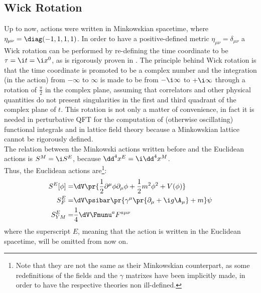 \begin{comment}
\\Everything that has been said for $\SUN$ can be also extended to $\mathit{SO}(N)$ by replacing \emph{unitary} with \emph{orthogonal} and \emph{traceless} with \emph{antisymmetric}. In fact, this discussion can be made for every compact\footnote{Compactness, \ie $\Tr{T^aT^b}$ positive defined, is required in order to have a bounded from below Hamiltonian.} group, such as the symplectic group $\mathit{Sp}(2N)$ and the five exceptional Lie groups $\mathit{G}(2)$, $\spF$, $\mathit{E}(6)$, $\mathit{E}(7)$ and $\mathit{E}(8)$.
\end{comment}

\subsection{Wick Rotation}
Up to now, actions were written in Minkowskian spacetime, where $\eta_{\mu\nu} = \diag(-1,1,1,1)$. In order to have a positive-defined metric $\eta_{\mu\nu} = \delta_{\mu\nu}$ a Wick rotation can be performed by re-defining the time coordinate to be $\tau = \i t = \i x^0$, as is rigorously proven in \cite{SCHLINGEMANN_1999}.
The principle behind Wick rotation is that the time coordinate is promoted to be a complex number and the integration (in the action) from $-\infty$ to $\infty$ is made to be from $-\i\infty$ to $+\i\infty$ through a rotation of $\frac\pi2$ in the complex plane, assuming that correlators and other physical quantities do not present singularities in the first and third quadrant of the complex plane of $t$.
This rotation is not only a matter of convenience, in fact it is needed in perturbative QFT for the computation of (otherwise oscillating) functional integrals and in lattice field theory because a Minkowskian lattice cannot be rigorously defined.\\
The relation between the Minkowski actions written before and the Euclidean actions is $S^M = \i S^E$, because $\dd^4x^E = \i \dd^4x^M$.\\
Thus, the Euclidean actions are\footnote{Note that they are not the same as their Minkowskian counterpart, as some redefinitions of the fields and the $\gamma$ matrixes have been implicitly made, in order to have the respective theories non ill-defined.}:
\begin{align}
    S^E[\phi] =& \dV \pr{\frac12\partial^\mu\phi\partial_\mu\phi+\frac12m^2\phi^2+V(\phi)} \label{1:ScalarActionEuclidean}\\
    S^E_F =& \dV\psibar\pr{\gamma^\mu\pr{\partial_\mu+\i g \A_\mu} + m}\psi \label{1:FerionActionEuclidean}\\
    S^E_{YM} =& \frac14 \dV \Fmunu^a F^{a\mu\nu} \label{1:YMActionEuclidean}
\end{align}
where the superscript $E$, meaning that the action is written in the Euclidean spacetime, will be omitted from now on.

